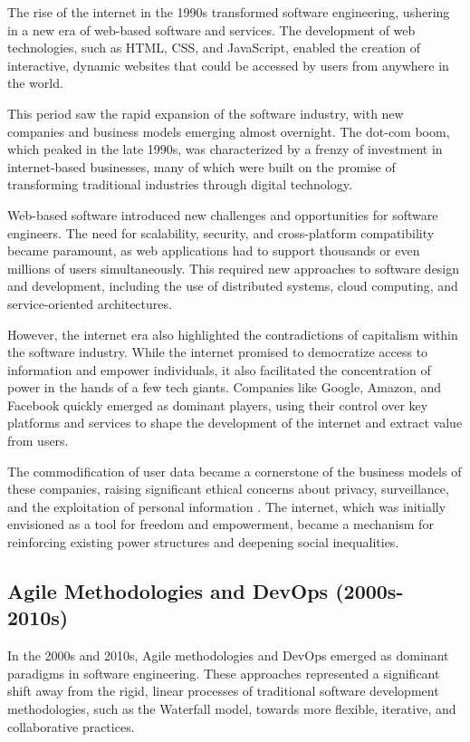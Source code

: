 \begin{refsection}
\begin{multicols}{2}
{The rise of the internet in the 1990s transformed software engineering, ushering in a new era of web-based software and services. The development of web technologies, such as HTML, CSS, and JavaScript, enabled the creation of interactive, dynamic websites that could be accessed by users from anywhere in the world.

This period saw the rapid expansion of the software industry, with new companies and business models emerging almost overnight. The dot-com boom, which peaked in the late 1990s, was characterized by a frenzy of investment in internet-based businesses, many of which were built on the promise of transforming traditional industries through digital technology.

Web-based software introduced new challenges and opportunities for software engineers. The need for scalability, security, and cross-platform compatibility became paramount, as web applications had to support thousands or even millions of users simultaneously. This required new approaches to software design and development, including the use of distributed systems, cloud computing, and service-oriented architectures.

However, the internet era also highlighted the contradictions of capitalism within the software industry. While the internet promised to democratize access to information and empower individuals, it also facilitated the concentration of power in the hands of a few tech giants. Companies like Google, Amazon, and Facebook quickly emerged as dominant players, using their control over key platforms and services to shape the development of the internet and extract value from users.

The commodification of user data became a cornerstone of the business models of these companies, raising significant ethical concerns about privacy, surveillance, and the exploitation of personal information \cite[p. 48]{zuboff2019}. The internet, which was initially envisioned as a tool for freedom and empowerment, became a mechanism for reinforcing existing power structures and deepening social inequalities.

\subsection{Agile Methodologies and DevOps (2000s-2010s)}

In the 2000s and 2010s, Agile methodologies and DevOps emerged as dominant paradigms in software engineering. These approaches represented a significant shift away from the rigid, linear processes of traditional software development methodologies, such as the Waterfall model, towards more flexible, iterative, and collaborative practices.

}
\end{multicols}
\end{refsection}
